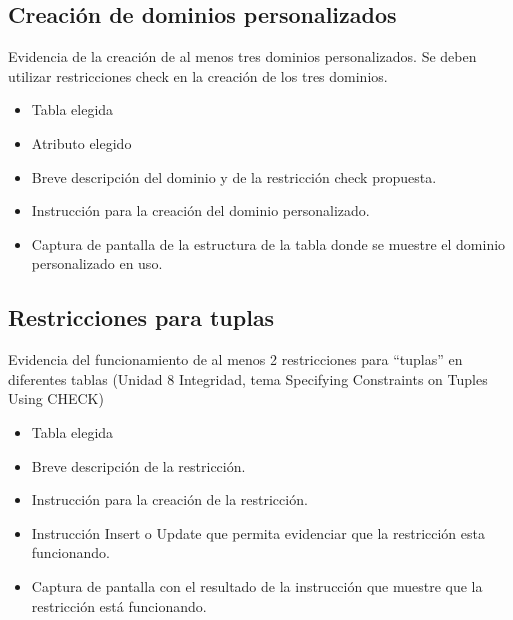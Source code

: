 \subsection{Creación de dominios personalizados}

Evidencia de la creación de al menos tres dominios personalizados. Se deben utilizar restricciones check en la creación de los tres dominios.
\begin{itemize}
    \item Tabla elegida
    \item Atributo elegido
    \item Breve descripción del dominio y de la restricción check propuesta.
    \item Instrucción para la creación del dominio personalizado.
    \item Captura de pantalla de la estructura de la tabla donde se muestre el dominio personalizado
    en uso.
\end{itemize}



\subsection{Restricciones para tuplas}

Evidencia del funcionamiento de al menos 2 restricciones para “tuplas” en diferentes tablas (Unidad 8 Integridad, tema Specifying Constraints on Tuples Using CHECK)
\begin{itemize}
    \item Tabla elegida
    \item Breve descripción de la restricción.
    \item Instrucción para la creación de la restricción.
    \item Instrucción Insert o Update que permita evidenciar que la restricción esta funcionando.
    \item Captura de pantalla con el resultado de la instrucción que muestre que la restricción está
    funcionando.
\end{itemize}



